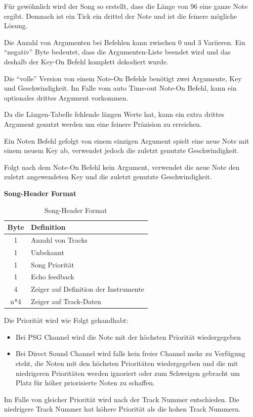 \documentclass[11pt,a4paper]{scrartcl}
\newcommand{\paratitle}[1] {
    \vspace{5mm}
    \large \textbf{#1} \normalsize
    \vspace{2mm}\newline
}
\begin{document}
F\"ur gew\"ohnlich wird der Song so erstellt, dass die L\"ange von 96 eine ganze Note ergibt. Demnach ist ein Tick ein drittel der Note und ist die feinere m\"ogliche L\"osung.

Die Anzahl von Argumenten bei Befehlen kann zwischen 0 und 3 Variieren. Ein \enquote{negativ} Byte bedeutet, dass die Argumenten-Liste beendet wird und das deshalb der Key-On Befehl komplett dekodiert wurde.

Die \enquote{volle} Version von einem Note-On Befehls ben\"otigt zwei Argumente, Key und Geschwindigkeit. Im Falle vom auto Time-out Note-On Befehl, kann ein optionales drittes Argument vorkommen. 

Da die L\"angen-Tabelle fehlende l\"angen Werte hat, kann ein extra drittes Argument genutzt werden um eine feinere Pr\"azision zu erreichen. 

Ein Noten Befehl gefolgt von einem einzigen Argument spielt eine neue Note mit einem neuem Key ab, verwendet jedoch die zuletzt genutzte Geschwindigkeit.

Folgt nach dem Note-On Befehl kein Argument, verwendet die neue Note den zuletzt angewendeten Key und die zuletzt genutzte Geschwindigkeit.

\vspace{-5pt}
\paratitle{Song-Header Format}
\vspace{-10pt}
\begin{table}[h]
    \centering
    \begin{tabular}{ c | p{8cm} }
        \textbf{Byte} & \textbf{Definition}\\
        \hline
        1 & Anzahl von Tracks\\
        \hline
        1 & Unbekannt\\
        \hline
        1 & Song Priorit\"at\\
				\hline
        1 & Echo feedback\\
				\hline
        4 & Zeiger auf Definition der Instrumente\\
				\hline
        n*4 & Zeiger auf Track-Daten\\
    \end{tabular}
    \caption{Song-Header Format}
    \label{table:HeaderFormat}
\end{table}
\vspace{-5pt}
Die Priorit\"at wird wie Folgt gehandhabt:
\begin{itemize}
\item Bei PSG Channel wird die Note mit der h\"ochsten Priorit\"at wiedergegeben
\item Bei Direct Sound Channel wird falls kein freier Channel mehr zu Verf\"ugung steht, die Noten mit den h\"ochsten Priorit\"aten wiedergegeben und die mit niedrigeren Priorit\"aten werden ignoriert oder zum Schweigen gebracht um Platz f\"ur h\"oher priorisierte Noten zu schaffen.
\end{itemize}
Im Falle von gleicher Priorit\"at wird nach der Track Nummer entschieden. Die niedrigere Track Nummer hat h\"ohere Priorit\"at als die hohen Track Nummern.
\end{document}
